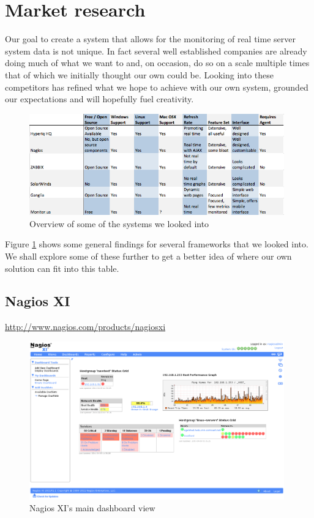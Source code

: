 \documentclass{l3proj}
\begin{document}

\section{Market research}
\label{section:MarketResearch}


Our goal to create a system that allows for the monitoring of real time server system data is not unique. In fact several well established companies are already doing much of what we want to and, on occasion, do so on a scale multiple times that of which we initially thought our own could be. Looking into these competitors has refined what we hope to achieve with our own system, grounded our expectations and will hopefully fuel creativity.

\begin{figure}[H]
\centering
\includegraphics[width=110mm]{Competitors/MarketSurveyTable}
\caption{Overview of some of the systems we looked into}
\label{fig:SurveyTable}
\end{figure}

Figure \ref{fig:SurveyTable} shows some general findings for several frameworks that we looked into. We shall explore some of these further to get a better idea of where our own solution can fit into this table.

\subsection{Nagios XI}

\url{http://www.nagios.com/products/nagiosxi}

\begin{figure}[H]
\centering
\includegraphics[width=110mm]{Competitors/NagiosXI_dashboard1.png}
\caption{Nagios XI's main dashboard view}
\end{figure}
\end{document}

